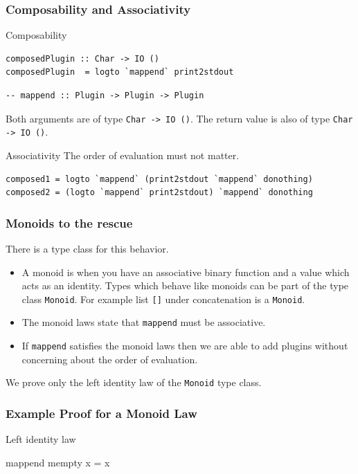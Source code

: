 \documentclass{beamer}
\begin{document}
\begin{frame}[fragile]
\frametitle{Composability and Associativity}
\begin{block}{Composability}
\begin{Verbatim}[fontsize=\footnotesize]
composedPlugin :: Char -> IO ()
composedPlugin  = logto `mappend` print2stdout
\end{Verbatim}

\begin{Verbatim}[fontsize=\footnotesize]
-- mappend :: Plugin -> Plugin -> Plugin
\end{Verbatim}
Both arguments are of type \verb|Char -> IO ()|. The return value is also of type \verb|Char -> IO ()|.
\end{block}
\begin{block}{Associativity}
The order of evaluation must not matter.
\begin{verbatim}
composed1 = logto `mappend` (print2stdout `mappend` donothing)
composed2 = (logto `mappend` print2stdout) `mappend` donothing
\end{verbatim}
  
\end{block}
\end{frame}

\begin{frame}[fragile]
  \frametitle{Monoids to the rescue}
There is a type class for this behavior.

  \begin{itemize}
\item A monoid is when you have an associative binary function and a value which acts as an identity. Types which behave like monoids can be part of the type class \verb|Monoid|. For example list \verb|[]| under concatenation is a \verb|Monoid|.
\item The monoid laws state that \verb|mappend| must be associative.
\item If \verb|mappend| satisfies the monoid laws then we are able to add plugins without concerning about the order of evaluation.
\end{itemize}
We prove only the left identity law of the \verb|Monoid| type class.
\end{frame}

\begin{frame}
\frametitle{Example Proof for a Monoid Law}
\begin{block}{Left identity law}

    mappend mempty x = x

\end{block}
\end{frame}
\end{document}
